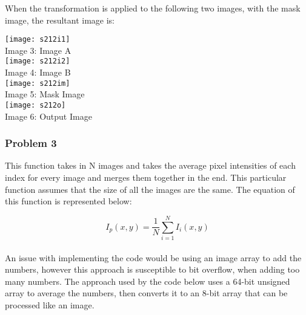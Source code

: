 \documentclass{article}
\begin{document}
	When the transformation is applied to the following two images, with the mask image, the resultant image is: \newline
	
	\begin{center}
		\noindent \texttt{[image: s212i1]}\\
		Image 3: Image A\\
		\texttt{[image: s212i2]}\\
		Image 4: Image B\\
		\texttt{[image: s212im]}\\
		Image 5: Mask Image\\
		\texttt{[image: s212o]}\\
		Image 6: Output Image\\
	\end{center}
	
	\subsubsection{Problem 3}
	
	This function takes in N images and takes the average pixel intensities of each index for every image and merges them together in the end. This particular function assumes that the size of all the images are the same. The equation of this function is represented below: \newline
	
	\begin{equation}
	I_{p}(x,y) = \frac{1}{N} \sum_{i=1}^{N} I_{i}(x,y) 
	\end{equation} \\
	
	An issue with implementing the code would be using an image array to add the numbers, however this approach is susceptible to bit overflow, when adding too many numbers. The approach used by the code below uses a 64-bit unsigned array to average the numbers, then converts it to an 8-bit array that can be processed like an image. \\
	
\end{document}

